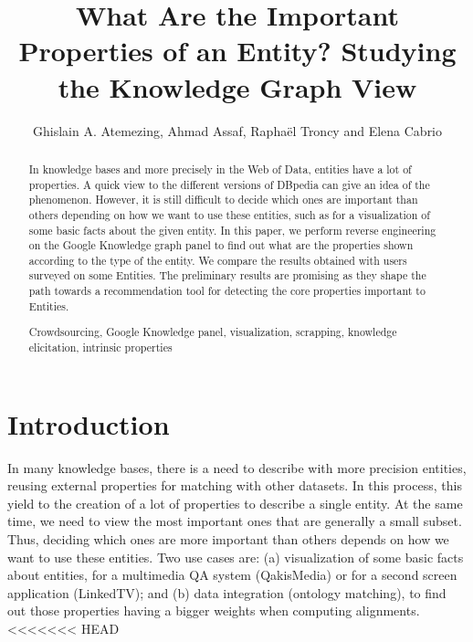 \documentclass[runningheads,a4paper]{llncs}
\newcommand{\keywords}[1]{\par\addvspace\baselineskip
\noindent\keywordname\enspace\ignorespaces#1}
\begin{document}
\title{What Are the Important Properties of an Entity? Studying the Knowledge Graph View}

\author{Ghislain A. Atemezing, Ahmad Assaf, Rapha\"{e}l Troncy and Elena Cabrio }



\maketitle


\begin{abstract}
In knowledge bases and more precisely in the Web of Data, entities have a lot of properties. A quick view to the different versions of DBpedia can give an idea of the phenomenon. However, it is still difficult to decide which ones are important than others depending on how we want to use these entities, such as for a visualization of some basic facts about the given entity. In this paper, we perform reverse engineering on the Google Knowledge graph panel to find out what are the properties shown according to the type of the entity. We compare the results obtained with users surveyed on some Entities. The preliminary results are promising as they shape the path towards a recommendation tool for detecting the core properties important to Entities.
\keywords{Crowdsourcing, Google Knowledge panel, visualization, scrapping, knowledge elicitation, intrinsic properties}
\end{abstract}


\section{Introduction}
\label{sec:introduction}
In many knowledge bases, there is a need to describe with more precision entities, reusing external properties for matching with other datasets. In this process, this yield to the creation of a lot of properties to describe a single entity. At the same time, we need to view the most important ones that are generally a small subset. Thus, deciding which ones are more important than others depends on how we want to use these entities. Two use cases are:
(a) visualization of some basic facts about entities, for a multimedia QA system (QakisMedia) or for a second screen application (LinkedTV); and (b) data integration (ontology matching), to find out those properties having a bigger weights when computing alignments.
<<<<<<< HEAD
   
\end{document}
